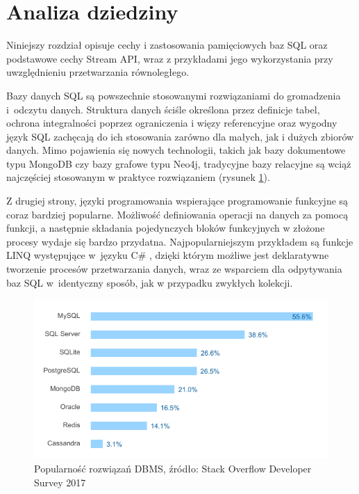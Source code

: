 \documentclass[12pt,twoside,openright]{extarticle}
\begin{document}
\cleardoublepage
\section{Analiza dziedziny}
    Niniejszy rozdział opisuje cechy i zastosowania pamięciowych baz SQL oraz podstawowe cechy Stream API, wraz z przykładami jego wykorzystania przy uwzględnieniu przetwarzania równoległego.

    Bazy danych SQL są powszechnie stosowanymi rozwiązaniami do gromadzenia i~odczytu danych. Struktura danych ściśle określona przez definicje tabel, ochrona integralności poprzez ograniczenia i więzy referencyjne oraz wygodny język SQL zachęcają do ich stosowania zarówno dla małych, jak i dużych zbiorów danych. Mimo pojawienia się nowych technologii, takich jak bazy dokumentowe typu MongoDB czy bazy grafowe typu Neo4j, tradycyjne bazy relacyjne są wciąż najczęściej stosowanym w praktyce rozwiązaniem (rysunek \ref{fig:dbstats}).

    Z drugiej strony, języki programowania wspierające programowanie funkcyjne są coraz bardziej popularne. Możliwość definiowania operacji na danych za pomocą funkcji, a następnie składania pojedynczych bloków funkcyjnych w złożone procesy wydaje się bardzo przydatna. Najpopularniejszym przykładem są funkcje LINQ występujące w~języku C\# \cite{linq}, dzięki którym możliwe jest deklaratywne tworzenie procesów przetwarzania danych, wraz ze wsparciem dla odpytywania baz SQL w~identyczny sposób, jak w przypadku zwykłych kolekcji.

\begin{figure}[h]
\centering
\includegraphics{dbstats.png}
\caption{Popularność rozwiązań DBMS, źródło: Stack Overflow Developer Survey 2017}
\label{fig:dbstats}
\end{figure}
\end{document}
